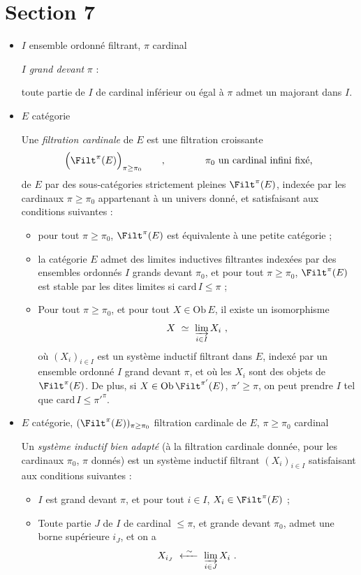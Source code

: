 \section*{Section 7}

\begin{itemize}
\item[\textbullet] $I$ ensemble ordonné filtrant, \quad $\pi$ cardinal

$I$ \textit{grand devant} $\pi$ :

toute partie de $I$ de cardinal inférieur ou égal à $\pi$ admet un majorant dans $I$.

\item[\textbullet] $E$ catégorie

Une \textit{filtration cardinale} de $E$ est une filtration croissante
\[
\Big(\Filt^{\pi}(E)\Big)_{\pi\geq\pi_0} \qquad , \qquad\qquad \pi_0 \text{ un cardinal infini fixé,}
\]
de $E$ par des sous-catégories strictement pleines $\Filt^{\pi}(E)$, indexée par les cardinaux $\pi \geq \pi_0$ appartenant à un univers donné, et satisfaisant aux conditions suivantes :
\begin{itemize}
\item[\textit{a})] pour tout $\pi \geq \pi_0$, $\Filt^{\pi}(E)$ est équivalente à une petite catégorie ;
\item[\textit{b})] la catégorie $E$ admet des limites inductives filtrantes indexées par des ensembles ordonnés $I$ grands devant $\pi_0$, et pour tout $\pi \geq \pi_0$, $\Filt^{\pi}(E)$ est stable par les dites limites si $\mathrm{card}\, I \leq \pi$ ;
\item[\textit{c})] Pour tout $\pi \geq \pi_0$, et pour tout $X \in \mathrm{Ob}\, E$, il existe un isomorphisme
\[
X \ \simeq\ \varinjlim_{i\in I} X_i \ ,
\]
où $(X_i)_{i\in I}$ est un système inductif filtrant dans $E$, indexé par un ensemble ordonné $I$ grand devant $\pi$, et où les $X_i$ sont des objets de $\Filt^{\pi}(E)$. De plus, si $X \in \mathrm{Ob}\,\Filt^{\pi'}(E)$, $\pi' \geq \pi$, on peut prendre $I$ tel que $\mathrm{card}\, I \leq \pi'^{\pi}$.
\end{itemize}

\item[\textbullet] $E$ catégorie, \quad $(\Filt^{\pi}(E))_{\pi\geq\pi_0}$ filtration cardinale de $E$, \quad $\pi \geq \pi_0$ cardinal

Un \textit{système inductif bien adapté} (à la filtration cardinale donnée, pour les cardinaux $\pi_0$, $\pi$ donnés) est un système inductif filtrant $(X_i)_{i\in I}$ satisfaisant aux conditions suivantes :
\begin{itemize}
\item[\textit{a})] $I$ est grand devant $\pi$, et pour tout $i \in I$, $X_i \in \Filt^{\pi}(E)$ ;
\item[\textit{b})] Toute partie $J$ de $I$ de cardinal $\leq \pi$, et grande devant $\pi_0$, admet une borne supérieure $i_J$, et on a
\[
X_{i_J} \ \xleftarrow{\ \sim\ }\ \varinjlim_{i\in J} X_i \ .
\]
\end{itemize}


\end{itemize}
